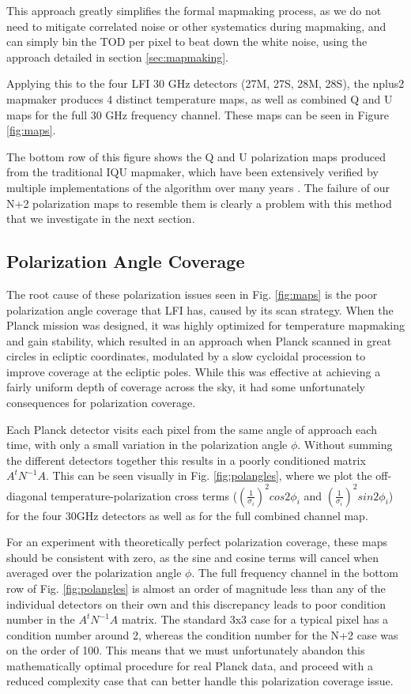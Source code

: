 \documentclass{aa}
\begin{document}
This approach greatly simplifies the formal mapmaking process, as we do not need to mitigate correlated noise or other systematics during mapmaking, and can simply bin the TOD per pixel to beat down the white noise, using the approach detailed in section \ref{sec:mapmaking}.

Applying this to the four LFI 30 GHz detectors (27M, 27S, 28M, 28S), the nplus2 mapmaker produces 4 distinct temperature maps, as well as combined Q and U maps for the full 30 GHz frequency channel. These maps can be seen in Figure \ref{fig:maps}.

The bottom row of this figure shows the Q and U polarization maps produced from the traditional IQU mapmaker, which have been extensively verified by multiple implementations of the algorithm over many years \citep{lfi2013,lfi2015,lfi2018}. The failure of our N+2 polarization maps to resemble them is clearly a problem with this method that we investigate in the next section.

\subsection{Polarization Angle Coverage}

The root cause of these polarization issues seen in Fig. \ref{fig:maps} is the poor polarization angle coverage that LFI has, caused by its scan strategy. When the Planck mission was designed, it was highly optimized for temperature mapmaking and gain stability, which resulted in an approach when Planck scanned in great circles in ecliptic coordinates, modulated by a slow cycloidal procession to improve coverage at the ecliptic poles. \citep{planckScan} While this was effective at achieving a fairly uniform depth of coverage across the sky, it had some unfortunately consequences for polarization coverage.

Each Planck detector visits each pixel from the same angle of approach each time, with only a small variation in the polarization angle $\phi$. Without summing the different detectors together this results in a poorly conditioned matrix $A^tN^{-1}A$. This can be seen visually in Fig. \ref{fig:polangles}, where we plot the off-diagonal temperature-polarization cross terms ($(\frac{1}{\sigma_i})^2 cos2\phi_i$ and $(\frac{1}{\sigma_i})^2 sin2\phi_i$) for the four 30GHz detectors as well as for the full combined channel map. 

For an experiment with theoretically perfect polarization coverage, these maps should be consistent with zero, as the sine and cosine terms will cancel when averaged over the polarization angle $\phi$. The full frequency channel in the bottom row of Fig. \ref{fig:polangles} is almost an order of magnitude less than any of the individual detectors on their own and this discrepancy leads to poor condition number in the $A^t N^{-1}A$ matrix. The standard 3x3 case for a typical pixel has a condition number around 2, whereas the condition number for the N+2 case was on the order of 100. This means that we must unfortunately abandon this mathematically optimal procedure for real Planck data, and proceed with a reduced complexity case that can better handle this polarization coverage issue.
\end{document}

